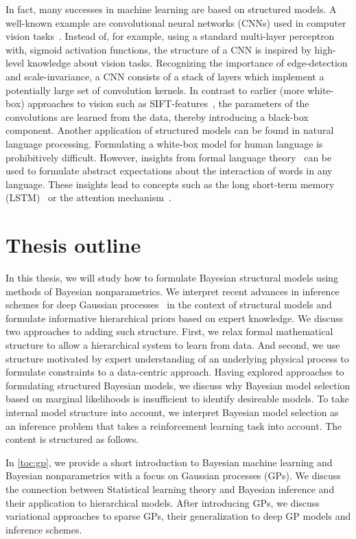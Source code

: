 In fact, many successes in machine learning are based on structured models.
A well-known example are convolutional neural networks (CNNs) used in computer vision tasks~\parencite{lecun_backpropagation_1989}.
Instead of, for example, using a standard multi-layer perceptron with, sigmoid activation functions, the structure of a CNN is inspired by high-level knowledge about vision tasks.
Recognizing the importance of edge-detection and scale-invariance, a CNN consists of a stack of layers which implement a potentially large set of convolution kernels.
In contrast to earlier (more white-box) approaches to vision such as SIFT-features~\parencite{lowe_object_1999}, the parameters of the convolutions are learned from the data, thereby introducing a black-box component.
Another application of structured models can be found in natural language processing.
Formulating a white-box model for human language is prohibitively difficult.
However, insights from formal language theory~\parencite{chomsky_aspects_2014} can be used to formulate abstract expectations about the interaction of words in any language.
These insights lead to concepts such as the long short-term memory (LSTM)~\parencite{hochreiter_long_1997} or the attention mechanism~\parencite{bahdanau_neural_2014,chorowski_attention-based_2015}.


\section{Thesis outline}
In this thesis, we will study how to formulate Bayesian structural models using methods of Bayesian nonparametrics.
We interpret recent advances in inference schemes for deep Gaussian processes~\parencite{damianou_deep_2013} in the context of structural models and formulate informative hierarchical priors based on expert knowledge.
We discuss two approaches to adding such structure.
First, we relax formal mathematical structure to allow a hierarchical system to learn from data.
And second, we use structure motivated by expert understanding of an underlying physical process to formulate constraints to a data-centric approach.
Having explored approaches to formulating structured Bayesian models, we discuss why Bayesian model selection based on marginal likelihoods is insufficient to identify desireable models.
To take internal model structure into account, we interpret Bayesian model selection as an inference problem that takes a reinforcement learning task into account.
The content is structured as follows.

In \cref{toc:gp}, we provide a short introduction to Bayesian machine learning and Bayesian nonparametrics with a focus on Gaussian processes (GPs).
We discuss the connection between Statistical learning theory and Bayesian inference and their application to hierarchical models.
After introducing GPs, we discuss variational approaches to sparse GPs, their generalization to deep GP models and inference schemes.

